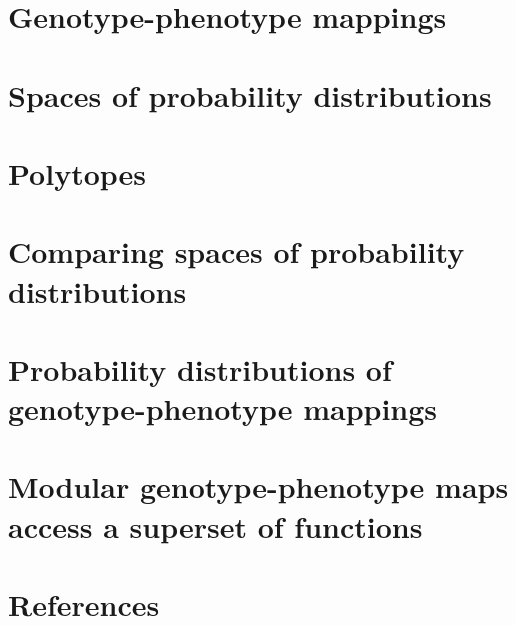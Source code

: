 

%

\newtoggle{thmsty}
\togglefalse{thmsty}

\newtoggle{longpres}
\togglefalse{longpres}









	\begin{frame}
		\titlepage
	\end{frame}
	
	\section[GP maps]{Genotype-phenotype mappings}
	
		
	\section[PD space]{Spaces of probability distributions}
%	
	
	\section{Polytopes}
		
	
	\section[PD comp]{Comparing spaces of probability distributions}
%	
	
	\section[PDs of GPs]{Probability distributions of genotype-phenotype mappings}
%    
	
	\section[Modular GPs]{Modular genotype-phenotype maps access a superset of functions}
%	
	
%	
	
	\section{References}
	
	
